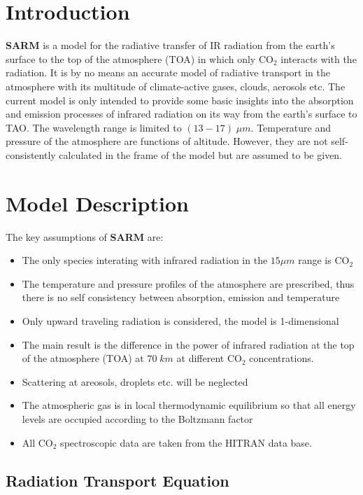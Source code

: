 \section{Introduction}

\textbf{SARM} is a model for the radiative transfer of IR radiation from the earth's surface to the  top of the atmosphere (TOA) in which only $\mathrm{CO}_2$ interacts with the radiation. It is by no means an accurate model of radiative transport in the atmosphere with its multitude of climate-active gases, clouds, aerosols etc. The current model is only intended to provide some basic insights into the absorption and emission processes of infrared radiation on its way from the earth's surface to TAO. The wavelength range is limited to $(13 - 17)\; \mu m$. Temperature and pressure of the atmosphere are functions of altitude. However, they are not self-consistently calculated in the frame of the model but are assumed to be given.
\section{Model Description}

The key assumptions of \textbf{SARM} are:
\begin{itemize}
	\item The only species interating with infrared radiation in the $15 \mu m$ range is $\mathrm{CO}_2$
	\item The temperature and pressure profiles of the atmosphere are prescribed, thus there is no self consistency between absorption, emission and temperature
	\item Only upward traveling radiation is considered, the model is 1-dimensional
	\item The main result is the difference in the power of infrared radiation at the top of the atmosphere (TOA) at $70 \;km$ at different $\mathrm{CO}_2$ concentrations.
	\item Scattering at areosols, droplets etc. will be neglected
	\item The atmospheric gas is in local thermodynamic equilibrium so that all energy levels are occupied according to the Boltzmann factor
	\item All $\mathrm{CO}_2$  spectroscopic data are taken from the HITRAN data base.
\end{itemize}


\subsection{Radiation Transport Equation}

